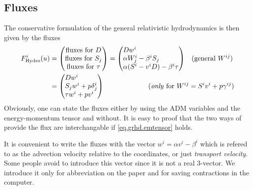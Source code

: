 \documentclass[a4paper]{article}
\newcommand{\hydro}{\text{Hydro}}
\newenvironment{pvector}{\begin{pmatrix*}[l]}{\end{pmatrix*}}
\begin{document}
\subsection{Fluxes}
The conservative formulation of the general relativistic hydrodynamics
is then given by the fluxes
\begin{align}
\label{eq.grhd.fluxes}
F^i_\hydro(u) &=
\begin{pmatrix}
\text{fluxes for } D \\
\text{fluxes for } S_j \\
\text{fluxes for } \tau
\end{pmatrix}
=
\begin{pvector}
D w^i \\
\alpha W^i_j - \beta^i S_j \\
\alpha (S^i - v^i D) - \beta^i \tau
\end{pvector}
\quad
\text{(general $W^{ij}$)}
\\
&=
\begin{pvector}
D w^i \\
S_j w^i + p \delta^i_j \\
\tau w^i + p v^i
\end{pvector}
\hspace{2.3cm} %
\text{(\emph{only} for $W^{ij}=S^i v^i + p\gamma^{ij}$)}
\end{align}
%
Obviously, one can state the fluxes either by using the ADM variables
and the energy-momentum tensor and without. It is easy to proof that
the two ways of provide the flux are interchangable if \eqref{eq.grhd.emtensor}
holds.

It is convenient to write the fluxes with the vector
$w^i=\alpha v^i - \beta^i$ which is refered to as the advection
velocity relative to the coordinates, or just \emph{transport
velocity}. Some people avoid to introduce this vector since it is
not a real 3-vector. We introduce it only for abbreviation on the
paper and for saving contractions in the computer.
\end{document}

